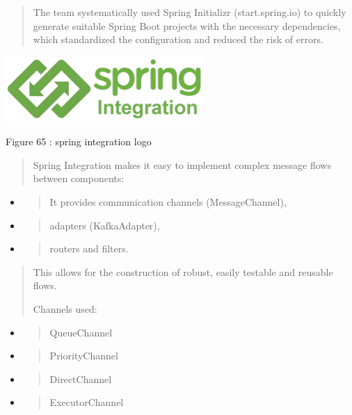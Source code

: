 \documentclass[12pt,a4paper]{report}
\begin{document}
\begin{quote}
The team systematically used Spring Initializr (start.spring.io) to
quickly generate suitable Spring Boot projects with the necessary
dependencies, which standardized the configuration and reduced the risk
of errors.
\end{quote}

\includegraphics[width=2.96244in,height=0.98737in]{vertopal_d1b0b2209edd4c6aa8254f57daa0953b/media/image84.png}

\protect\hypertarget{_Toc201954541}{}{}Figure 65 : spring integration
logo

\begin{quote}
Spring Integration makes it easy to implement complex message flows
between components:
\end{quote}

\begin{itemize}
\item
  \begin{quote}
  It provides communication channels (MessageChannel),
  \end{quote}
\item
  \begin{quote}
  adapters (KafkaAdapter),
  \end{quote}
\item
  \begin{quote}
  routers and filters.
  \end{quote}
\end{itemize}

\begin{quote}
This allows for the construction of robust, easily testable and reusable
flows.

Channels used:
\end{quote}

\begin{itemize}
\item
  \begin{quote}
  QueueChannel
  \end{quote}
\item
  \begin{quote}
  PriorityChannel
  \end{quote}
\item
  \begin{quote}
  DirectChannel
  \end{quote}
\item
  \begin{quote}
  ExecutorChannel
  \end{quote}
\end{itemize}
\end{document}
